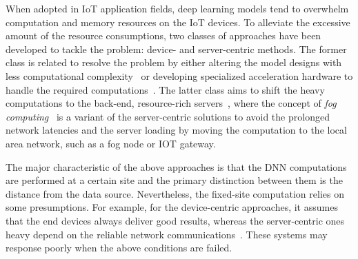 \documentclass[format=acmsmall, review=false, screen=true]{acmart}
\begin{document}

When adopted in IoT application fields, deep learning models tend to overwhelm computation and memory resources on the IoT devices. To alleviate the excessive amount of the resource consumptions, two classes of approaches have been developed to tackle the problem: device- and server-centric methods. The former class is related to resolve the problem by either altering the model designs with less computational complexity~\cite{McDanel17,hadidi2018musical,kim2015compression,lei2013accurate,Hauswald2014,han2016mcdnn,iandola2016squeezenet,parvez2017embedded} or developing specialized acceleration hardware to handle the required computations~\cite{LSTMFPGA2017,Deguchi2018,Hong2017,Wang2016,Bang2017}. The latter class aims to shift the heavy computations to the back-end, resource-rich servers~\cite{quan2018novel,Kumar2010}, where the concept of \emph{fog computing}~\cite{bonomi2014fog} is a variant of the server-centric solutions to avoid the prolonged network latencies and the server loading by moving the computation to the local area network, such as a fog node or IOT gateway. %

The major characteristic of the above approaches is that the DNN computations are performed at a certain site and the primary distinction between them is the distance from the data source. Nevertheless, the fixed-site computation relies on some presumptions. For example, for the device-centric approaches, it assumes that the end devices always deliver good results, whereas the server-centric ones heavy depend on the reliable network communications~\cite{raonovel}. These systems may response poorly when the above conditions are failed.
\end{document}
